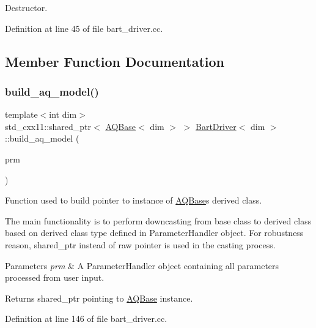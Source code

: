 Destructor. 



Definition at line 45 of file bart\+\_\+driver.\+cc.



\subsection{Member Function Documentation}
\mbox{\label{class_bart_driver_ac5d2985a0286bdac161f3c0fbb80197a}} 
\subsubsection{\texorpdfstring{build\+\_\+aq\+\_\+model()}{build\_aq\_model()}}
{\footnotesize\ttfamily template$<$int dim$>$ \\
std\+\_\+cxx11\+::shared\+\_\+ptr$<$ \hyperlink{class_a_q_base}{A\+Q\+Base}$<$ dim $>$ $>$ \hyperlink{class_bart_driver}{Bart\+Driver}$<$ dim $>$\+::build\+\_\+aq\+\_\+model (\begin{DoxyParamCaption}\item[{Parameter\+Handler \&}]{prm }\end{DoxyParamCaption})\hspace{0.3cm}{\ttfamily [private]}}



Function used to build pointer to instance of \hyperlink{class_a_q_base}{A\+Q\+Base}\textquotesingle{}s derived class. 

The main functionality is to perform downcasting from base class to derived class based on derived class type defined in Parameter\+Handler object. For robustness reason, shared\+\_\+ptr instead of raw pointer is used in the casting process.


\begin{DoxyParams}{Parameters}
{\em prm} & A Parameter\+Handler object containing all parameters processed from user input. \\
\hline
\end{DoxyParams}
\begin{DoxyReturn}{Returns}
shared\+\_\+ptr pointing to \hyperlink{class_a_q_base}{A\+Q\+Base} instance. 
\end{DoxyReturn}


Definition at line 146 of file bart\+\_\+driver.\+cc.

